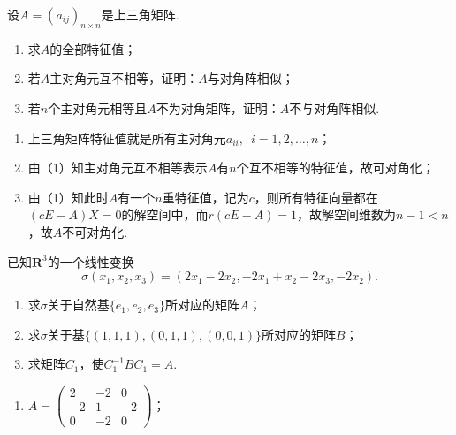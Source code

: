 \begin{exercise}
\begin{exgroup}
        \item 设$A=(a_{ij})_{n\times n}$是上三角矩阵.
        \begin{enumerate}
            \item 求$A$的全部特征值；

            \item 若$A$主对角元互不相等，证明：$A$与对角阵相似；

            \item 若$n$个主对角元相等且$A$不为对角矩阵，证明：$A$不与对角阵相似.
        \end{enumerate}
        \begin{answer}
            \begin{enumerate}
                \item 上三角矩阵特征值就是所有主对角元$a_{ii},\enspace i=1,2,\ldots,n$；

                \item 由（1）知主对角元互不相等表示$A$有$n$个互不相等的特征值，故可对角化；

                \item 由（1）知此时$A$有一个$n$重特征值，记为$c$，则所有特征向量都在$(cE-A)X=0$的解空间中，而$r(cE-A)=1$，故解空间维数为$n-1<n$，故$A$不可对角化.
            \end{enumerate}
        \end{answer}

        \item 已知$\mathbf{R}^3$的一个线性变换
        \[\sigma(x_1,x_2,x_3)=(2x_1-2x_2,-2x_1+x_2-2x_3,-2x_2).\]
        \begin{enumerate}
            \item 求$\sigma$关于自然基$\{e_1,e_2,e_3\}$所对应的矩阵$A$；

            \item 求$\sigma$关于基$\{(1,1,1),(0,1,1),(0,0,1)\}$所对应的矩阵$B$；

            \item 求矩阵$C_1$，使$C_1^{-1}BC_1=A$.
        \end{enumerate}
        \begin{answer}
            \begin{enumerate}
                \item $A=\begin{pmatrix}
                              2 & -2 & 0 \\ -2 & 1 & -2 \\ 0 & -2 & 0
                          \end{pmatrix}$；


\end{enumerate}
\end{answer}
\end{exgroup}
\end{exercise}
